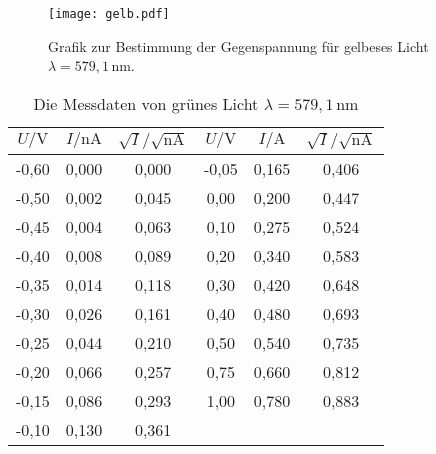   \begin{figure}[H]
    \centering
    \texttt{[image: gelb.pdf]}
    \caption{Grafik zur Bestimmung der Gegenspannung für gelbeses Licht $ \lambda = 579,1\,\text{nm}$.}
    \label{fig:gelb}
  \end{figure}
  \noindent
  \begin{table}[H]
    \centering
    \caption{Die Messdaten von grünes Licht $\lambda = 579,1 \,\text{nm}$ }
    \label{tab:grün}
    \begin{tabular}{| c | c |c||c|c|c| }
    \toprule
    $U/\mathrm{V}$ &$I/\mathrm{nA}$  &  $\sqrt{I}/\sqrt{\mathrm{nA}}$&$U/\mathrm{V}$ & $I/\mathrm{A} $& $\sqrt{I}/\sqrt{\mathrm{nA}}$  \\
    \midrule
    
    -0,60 & 	0,000	& 0,000 &	-0,05	&  0,165 &	0,406\\
    -0,50 & 	0,002	& 0,045 &	 0,00	&  0,200 &	0,447\\
    -0,45 & 	0,004	& 0,063 &	 0,10	&  0,275 &	0,524\\
    -0,40 & 	0,008	& 0,089 &	 0,20	&  0,340 &	0,583\\
    -0,35 & 	0,014	& 0,118 &	 0,30	&  0,420 &	0,648\\
    -0,30 & 	0,026	& 0,161 &	 0,40	&  0,480 &	0,693\\
    -0,25 & 	0,044	& 0,210 &	 0,50	&  0,540 &	0,735\\
    -0,20 & 	0,066	& 0,257 &	 0,75	&  0,660 &	0,812\\
    -0,15 & 	0,086	& 0,293 &	 1,00	&  0,780 &	0,883\\
    -0,10 & 	0,130	& 0,361 &		&&\\	
    

      \bottomrule
      \end{tabular}
    \end{table}

